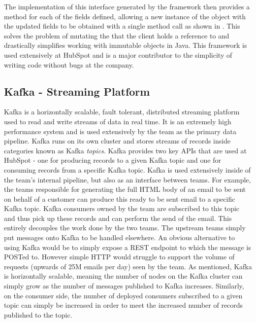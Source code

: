 

The implementation of this interface generated by the framework then provides a  method for each of the fields defined, allowing a new instance of the object with the updated fields to be obtained with a single method call as shown in . This solves the problem of mutating the  that the client holds a reference to and drastically simplifies working with immutable objects in Java. This framework is used extensively at HubSpot and is a major contributor to the simplicity of writing code without bugs at the company.




\subsection{Kafka - Streaming Platform}\label{sec:kafka}
Kafka \cite{kafka} is a horizontally scalable, fault tolerant, distributed streaming platform used to read and write streams of data in real time. It is an extremely high performance system and is used extensively by the \team{} team as the primary data pipeline. Kafka runs on its own cluster and stores streams of records inside categories known as Kafka \textit{topics}. Kafka provides two key APIs that are used at HubSpot - one for producing records to a given Kafka topic and one for consuming records from a specific Kafka topic. Kafka is used extensively inside of the team's internal pipeline, but also as an interface between teams. For example, the teams responsible for generating the full HTML body of an email to be sent on behalf of a customer can produce this ready to be sent email to a specific Kafka topic. Kafka consumers owned by the \team{} team are subscribed to this topic and thus pick up these records and can perform the send of the email. This entirely decouples the work done by the two teams. The upstream teams simply put messages onto Kafka to be handled elsewhere. An obvious alternative to using Kafka would be to simply expose a REST endpoint to which the message is POSTed to. However simple HTTP would struggle to support the volume of requests (upwards of 25M emails per day) seen by the \team{} team. As mentioned, Kafka is horizontally scalable, meaning the number of nodes on the Kafka cluster can simply grow as the number of messages published to Kafka increases. Similarly, on the consumer side, the number of deployed consumers subscribed to a given topic can simply be increased in order to meet the increased number of records published to the topic.

